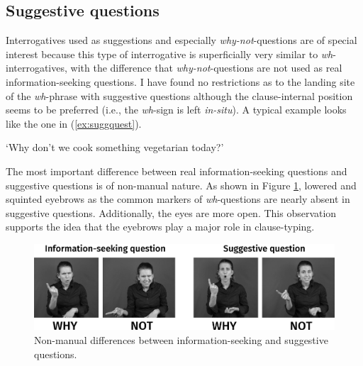 

\subsection{Suggestive questions}
Interrogatives used as suggestions and especially \textit{why-not}-questions are of special interest because this type of interrogative is superficially very similar to \textit{wh}-interrogatives, with the difference that \textit{why-not}-questions are not used as real information-seeking questions. I have found no restrictions as to the landing site of the \textit{wh}-phrase with suggestive questions although the clause-internal position seems to be preferred (i.e., the \textit{wh}-sign is left \textit{in-situ}). A typical example looks like the one in (\ref{ex:suggquest}). 

\begin{exe}
\ex {}
\glt `Why don't we cook something vegetarian today?' \label{ex:suggquest}
\end{exe}

\noindent The most important difference between real information-seeking questions and suggestive questions is of non-manual nature. As shown in Figure \ref{suggquest}, lowered and squinted eyebrows as the common markers of \textit{wh}-questions are nearly absent in suggestive questions. Additionally, the eyes are more open. This observation supports the idea that the eyebrows play a major role in clause-typing. 

\begin{figure}[bt]
\centering
	\includegraphics[width=1.0\textwidth]{suggquestsw.jpg}
	\caption{Non-manual differences between information-seeking and suggestive questions. }
	\label{suggquest}
\end{figure}




